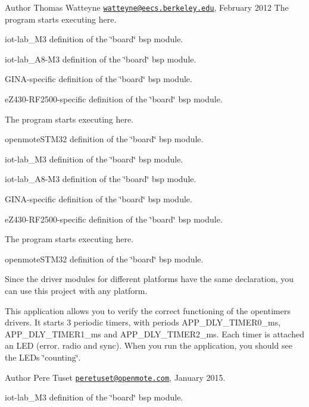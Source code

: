 \begin{DoxyAuthor}{Author}
Thomas Watteyne \href{mailto:watteyne@eecs.berkeley.edu}{\tt watteyne@eecs.\+berkeley.\+edu}, February 2012 The program starts executing here.
\end{DoxyAuthor}
iot-\/lab\+\_\+\+M3 definition of the \char`\"{}board\char`\"{} bsp module.

iot-\/lab\+\_\+\+A8-\/\+M3 definition of the \char`\"{}board\char`\"{} bsp module.

G\+I\+N\+A-\/specific definition of the \char`\"{}board\char`\"{} bsp module.

e\+Z430-\/\+R\+F2500-\/specific definition of the \char`\"{}board\char`\"{} bsp module.

The program starts executing here.

openmote\+S\+T\+M32 definition of the \char`\"{}board\char`\"{} bsp module.

iot-\/lab\+\_\+\+M3 definition of the \char`\"{}board\char`\"{} bsp module.

iot-\/lab\+\_\+\+A8-\/\+M3 definition of the \char`\"{}board\char`\"{} bsp module.

G\+I\+N\+A-\/specific definition of the \char`\"{}board\char`\"{} bsp module.

e\+Z430-\/\+R\+F2500-\/specific definition of the \char`\"{}board\char`\"{} bsp module.

The program starts executing here.

openmote\+S\+T\+M32 definition of the \char`\"{}board\char`\"{} bsp module.

Since the driver modules for different platforms have the same declaration, you can use this project with any platform.

This application allows you to verify the correct functioning of the opentimers drivers. It starts 3 periodic timers, with periods A\+P\+P\+\_\+\+D\+L\+Y\+\_\+\+T\+I\+M\+E\+R0\+\_\+ms, A\+P\+P\+\_\+\+D\+L\+Y\+\_\+\+T\+I\+M\+E\+R1\+\_\+ms and A\+P\+P\+\_\+\+D\+L\+Y\+\_\+\+T\+I\+M\+E\+R2\+\_\+ms. Each timer is attached an L\+ED (error. radio and sync). When you run the application, you should see the L\+E\+Ds \char`\"{}counting\char`\"{}.

\begin{DoxyAuthor}{Author}
Pere Tuset \href{mailto:peretuset@openmote.com}{\tt peretuset@openmote.\+com}, January 2015.
\end{DoxyAuthor}
iot-\/lab\+\_\+\+M3 definition of the \char`\"{}board\char`\"{} bsp module.

